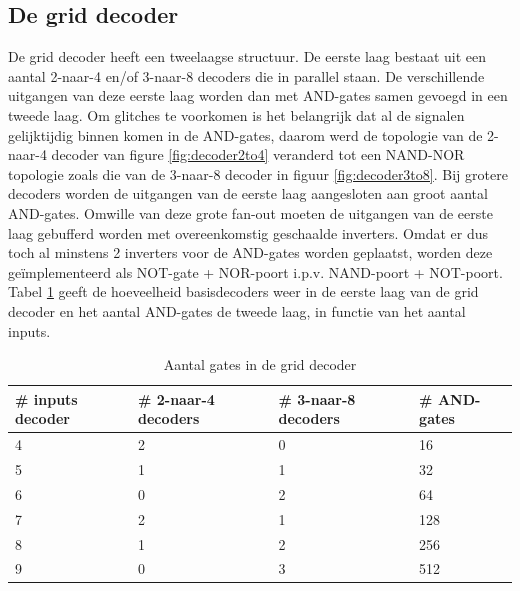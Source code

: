 \subsection{De grid decoder}
De grid decoder heeft een tweelaagse structuur. De eerste laag bestaat uit een aantal 2-naar-4 en/of 3-naar-8 decoders die in parallel staan. De verschillende uitgangen van deze eerste laag worden dan met AND-gates samen gevoegd in een tweede laag. Om glitches te voorkomen is het belangrijk dat al de signalen gelijktijdig binnen komen in de AND-gates, daarom werd de topologie van de 2-naar-4 decoder van figure \ref{fig:decoder2to4} veranderd tot een NAND-NOR topologie zoals die van de 3-naar-8 decoder in figuur \ref{fig:decoder3to8}. Bij grotere decoders worden de uitgangen van de eerste laag aangesloten aan groot aantal AND-gates. Omwille van deze grote fan-out moeten de uitgangen van de eerste laag gebufferd worden met overeenkomstig geschaalde inverters. Omdat er dus toch al minstens 2 inverters voor de AND-gates worden geplaatst, worden deze geïmplementeerd als NOT-gate + NOR-poort i.p.v. NAND-poort + NOT-poort. Tabel \ref{tab:griddecoder} geeft de hoeveelheid basisdecoders weer in de eerste laag van de grid decoder en het aantal AND-gates de tweede laag, in functie van het aantal inputs.

\begin{table}
\begin{center}
\begin{tabular}{llll}
\hline
\# inputs decoder & \# 2-naar-4 decoders & \# 3-naar-8 decoders & \# AND-gates\\
\hline
4 & 2 & 0 & 16\\
5 & 1 & 1 & 32\\
6 & 0 & 2 & 64\\
7 & 2 & 1 & 128\\
8 & 1 & 2 & 256\\
9 & 0 & 3 & 512\\
\hline
\end{tabular}
\end{center}
\caption{Aantal gates in de grid decoder}
\label{tab:griddecoder}
\end{table}

